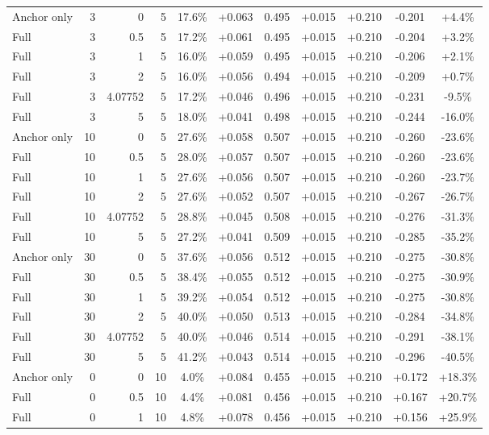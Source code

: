 \begin{table}[htbp]
\begin{tabular}{lrrrccccccc}
Anchor only & 3 & 0 & 5 & 17.6\% & +0.063 & 0.495 & +0.015 & +0.210 & -0.201 & +4.4\% \\
Full & 3 & 0.5 & 5 & 17.2\% & +0.061 & 0.495 & +0.015 & +0.210 & -0.204 & +3.2\% \\
Full & 3 & 1 & 5 & 16.0\% & +0.059 & 0.495 & +0.015 & +0.210 & -0.206 & +2.1\% \\
Full & 3 & 2 & 5 & 16.0\% & +0.056 & 0.494 & +0.015 & +0.210 & -0.209 & +0.7\% \\
Full & 3 & 4.07752 & 5 & 17.2\% & +0.046 & 0.496 & +0.015 & +0.210 & -0.231 & -9.5\% \\
Full & 3 & 5 & 5 & 18.0\% & +0.041 & 0.498 & +0.015 & +0.210 & -0.244 & -16.0\% \\
Anchor only & 10 & 0 & 5 & 27.6\% & +0.058 & 0.507 & +0.015 & +0.210 & -0.260 & -23.6\% \\
Full & 10 & 0.5 & 5 & 28.0\% & +0.057 & 0.507 & +0.015 & +0.210 & -0.260 & -23.6\% \\
Full & 10 & 1 & 5 & 27.6\% & +0.056 & 0.507 & +0.015 & +0.210 & -0.260 & -23.7\% \\
Full & 10 & 2 & 5 & 27.6\% & +0.052 & 0.507 & +0.015 & +0.210 & -0.267 & -26.7\% \\
Full & 10 & 4.07752 & 5 & 28.8\% & +0.045 & 0.508 & +0.015 & +0.210 & -0.276 & -31.3\% \\
Full & 10 & 5 & 5 & 27.2\% & +0.041 & 0.509 & +0.015 & +0.210 & -0.285 & -35.2\% \\
Anchor only & 30 & 0 & 5 & 37.6\% & +0.056 & 0.512 & +0.015 & +0.210 & -0.275 & -30.8\% \\
Full & 30 & 0.5 & 5 & 38.4\% & +0.055 & 0.512 & +0.015 & +0.210 & -0.275 & -30.9\% \\
Full & 30 & 1 & 5 & 39.2\% & +0.054 & 0.512 & +0.015 & +0.210 & -0.275 & -30.8\% \\
Full & 30 & 2 & 5 & 40.0\% & +0.050 & 0.513 & +0.015 & +0.210 & -0.284 & -34.8\% \\
Full & 30 & 4.07752 & 5 & 40.0\% & +0.046 & 0.514 & +0.015 & +0.210 & -0.291 & -38.1\% \\
Full & 30 & 5 & 5 & 41.2\% & +0.043 & 0.514 & +0.015 & +0.210 & -0.296 & -40.5\% \\
Anchor only & 0 & 0 & 10 & 4.0\% & +0.084 & 0.455 & +0.015 & +0.210 & +0.172 & +18.3\% \\
Full & 0 & 0.5 & 10 & 4.4\% & +0.081 & 0.456 & +0.015 & +0.210 & +0.167 & +20.7\% \\
Full & 0 & 1 & 10 & 4.8\% & +0.078 & 0.456 & +0.015 & +0.210 & +0.156 & +25.9\% \\

\end{tabular}
\end{table}
